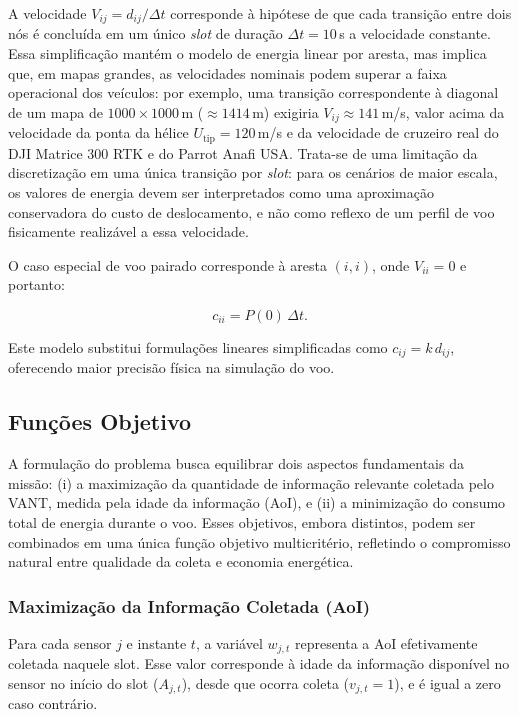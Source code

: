 \documentclass[
    12pt,
    oneside,
    a4paper,
    brazil
]{abntex2}
\begin{document}
    A velocidade $V_{ij} = d_{ij}/\Delta t$ corresponde à hipótese de que cada transição entre dois nós é concluída em um único \textit{slot} de duração $\Delta t = 10$\,s a velocidade constante. Essa simplificação mantém o modelo de energia linear por aresta, mas implica que, em mapas grandes, as velocidades nominais podem superar a faixa operacional dos veículos: por exemplo, uma transição correspondente à diagonal de um mapa de $1000\times1000$\,m ($\approx 1414$\,m) exigiria $V_{ij} \approx 141$\,m/s, valor acima da velocidade da ponta da hélice $U_{\text{tip}} = 120$\,m/s e da velocidade de cruzeiro real do DJI Matrice 300 RTK e do Parrot Anafi USA. Trata-se de uma limitação da discretização em uma única transição por \textit{slot}: para os cenários de maior escala, os valores de energia devem ser interpretados como uma aproximação conservadora do custo de deslocamento, e não como reflexo de um perfil de voo fisicamente realizável a essa velocidade.

    O caso especial de voo pairado corresponde à aresta $(i,i)$, onde $V_{ii}=0$ e portanto:

    \[
    c_{ii} = P(0)\,\Delta t.
    \]

    Este modelo substitui formulações lineares simplificadas como $c_{ij} = k\, d_{ij}$, oferecendo maior precisão física na simulação do voo.


    \subsection{Funções Objetivo}

    A formulação do problema busca equilibrar dois aspectos fundamentais da missão: 
    (i) a maximização da quantidade de informação relevante coletada pelo VANT, medida pela idade da informação (AoI), e
    (ii) a minimização do consumo total de energia durante o voo.  
    Esses objetivos, embora distintos, podem ser combinados em uma única função objetivo multicritério, refletindo o compromisso natural entre qualidade da coleta e economia energética.
    
    \subsubsection{Maximização da Informação Coletada (AoI)}
    
    Para cada sensor $j$ e instante $t$, a variável $w_{j,t}$ representa a AoI efetivamente coletada naquele slot. Esse valor corresponde à idade da informação disponível no sensor no início do slot ($A_{j,t}$), desde que ocorra coleta ($v_{j,t}=1$), e é igual a zero caso contrário.
    
\end{document}
